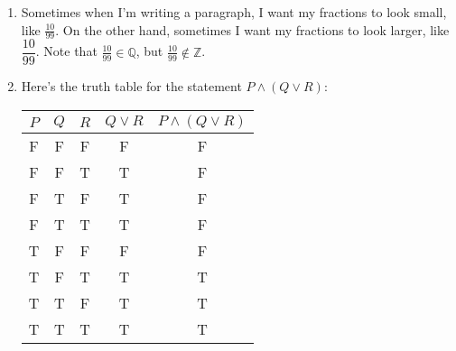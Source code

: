 \documentclass[10pt,letterpaper]{article}
\begin{document}
\begin{enumerate}
    \item Sometimes when I’m writing a paragraph, I want my fractions to look small, like $\frac{10}{99}$. On the other hand, sometimes I want my fractions to look larger, like $\dfrac{10}{99}$. Note that $\frac{10}{99}\in\mathbb{Q}$, but $\frac{10}{99}\notin\mathbb{Z}$.

    \item Here’s the truth table for the statement $P\land(Q\lor R)$:
    
    \begin{center}
        \begin{tabular}{|c|c|c||c|c|}
        \hline
        $P$ & $Q$ & $R$ & $Q\lor R$ & $P\land (Q\lor R)$ \\
        \hline
        F & F & F & F & F \\ 
        \hline
        F & F & T & T & F \\ 
        \hline
        F & T & F & T & F \\ 
        \hline
        F & T & T & T & F \\ 
        \hline
        T & F & F & F & F \\ 
        \hline
        T & F & T & T & T \\ 
        \hline
        T & T & F & T & T \\ 
        \hline
        T & T & T & T & T \\ 
        \hline
    \end{tabular}
    \end{center}
\end{enumerate}
\end{document}
